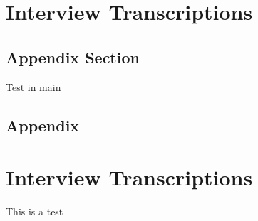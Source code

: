\chapter{Interview Transcriptions}
\section{Appendix Section}
Test in main
\section*{Appendix}
\chapter{Interview Transcriptions}
This is a test


